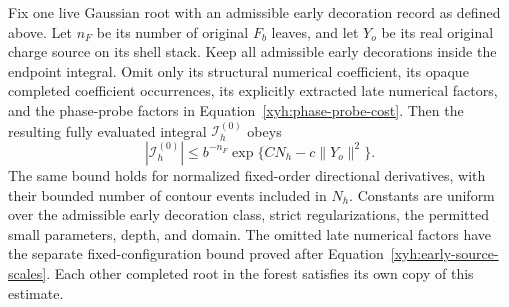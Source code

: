 \begin{lemma}\label{xyh:endpoint-estimate}
Fix one live Gaussian root with an admissible early decoration record as
defined above. Let $n_F$ be its number of original $F_b$ leaves, and let
$Y_o$ be its real original charge source on its shell stack. Keep all
admissible early decorations inside the endpoint integral. Omit only its
structural numerical coefficient, its opaque completed coefficient
occurrences, its explicitly extracted late numerical factors, and the
phase-probe factors in Equation~\eqref{xyh:phase-probe-cost}. Then the
resulting fully evaluated integral $\mathcal I_h^{(0)}$ obeys
\begin{equation}\label{xyh:endpoint-bound}
 |\mathcal I_h^{(0)}|\le b^{-n_F}\exp\{CN_h-c\|Y_o\|^2\}.
\end{equation}
The same bound holds for normalized fixed-order directional derivatives,
with their bounded number of contour events included in $N_h$. Constants
are uniform over the admissible early decoration class, strict
regularizations, the permitted small parameters, depth, and domain.
The omitted late numerical factors have the separate fixed-configuration
bound proved after Equation~\eqref{xyh:early-source-scales}. Each other
completed root in the forest satisfies its own copy of this estimate.
\end{lemma}
